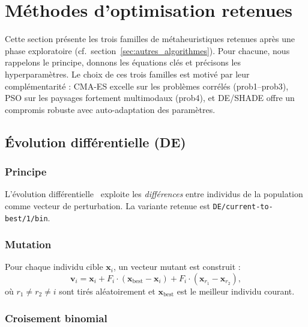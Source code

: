 \section{Méthodes d'optimisation retenues}
\label{sec:methods}

Cette section présente les trois familles de métaheuristiques retenues après
une phase exploratoire (cf.\ section~\ref{sec:autres_algorithmes}).  Pour
chacune, nous rappelons le principe, donnons les équations clés et précisons
les hyperparamètres.  Le choix de ces trois familles est motivé par leur
complémentarité : CMA-ES excelle sur les problèmes corrélés (prob1--prob3),
PSO sur les paysages fortement multimodaux (prob4), et DE/SHADE offre un
compromis robuste avec auto-adaptation des paramètres.

\subsection{Évolution différentielle (DE)}
\label{sec:de}

\subsubsection{Principe}

L'évolution différentielle~\cite{storn1997} exploite les \emph{différences}
entre individus de la population comme vecteur de perturbation.  La variante
retenue est \texttt{DE/current-to-best/1/bin}.

\subsubsection{Mutation}

Pour chaque individu cible $\mathbf{x}_i$, un vecteur mutant est construit :
\begin{equation}
\label{eq:de-mutation}
  \mathbf{v}_i = \mathbf{x}_i + F_i \cdot (\mathbf{x}_{\text{best}} -
  \mathbf{x}_i) + F_i \cdot (\mathbf{x}_{r_1} - \mathbf{x}_{r_2}),
\end{equation}
où $r_1 \neq r_2 \neq i$ sont tirés aléatoirement et $\mathbf{x}_{\text{best}}$
est le meilleur individu courant.

\subsubsection{Croisement binomial}

